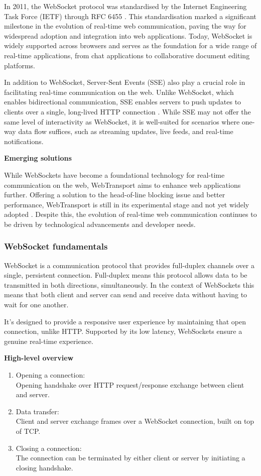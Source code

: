 In 2011, the WebSocket protocol was standardised by the Internet Engineering Task Force (IETF) through RFC 6455 \cite{mdn-ws}. This standardisation marked a significant milestone in the evolution of real-time web communication, paving the way for widespread adoption and integration into web applications. Today, WebSocket is widely supported across browsers and serves as the foundation for a wide range of real-time applications, from chat applications to collaborative document editing platforms.

In addition to WebSocket, Server-Sent Events (SSE) also play a crucial role in facilitating real-time communication on the web. Unlike WebSocket, which enables bidirectional communication, SSE enables servers to push updates to clients over a single, long-lived HTTP connection \cite{mdn-sse}. While SSE may not offer the same level of interactivity as WebSocket, it is well-suited for scenarios where one-way data flow suffices, such as streaming updates, live feeds, and real-time notifications.

\textbf{Emerging solutions}

While WebSockets have become a foundational technology for real-time communication on the web, WebTransport aims to enhance web applications further. Offering a solution to the head-of-line blocking issue and better performance, WebTransport is still in its experimental stage and not yet widely adopted \cite{mdn-wt}. Despite this, the evolution of real-time web communication continues to be driven by technological advancements and developer needs.

\subsubsection{WebSocket fundamentals}

WebSocket is a communication protocol that provides full-duplex channels over a single, persistent connection. Full-duplex means this protocol allows data to be transmitted in both directions, simultaneously. In the context of WebSockets this means that both client and server can send and receive data without having to wait for one another.

It's designed to provide a responsive user experience by maintaining that open connection, unlike HTTP. Supported by its low latency, WebSockets ensure a genuine real-time experience. \cite{ws-rfc}

\textbf{High-level overview}

\begin{enumerate}
  \item Opening a connection: \\ Opening handshake over HTTP request/response exchange between client and server.
  \item Data transfer: \\ Client and server exchange frames over a WebSocket connection, built on top of TCP.
  \item Closing a connection: \\ The connection can be terminated by either client or server by initiating a closing handshake.
\end{enumerate}

